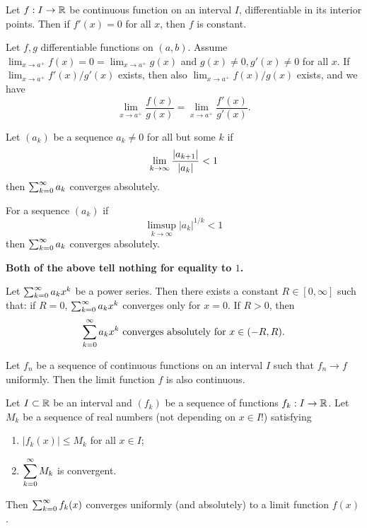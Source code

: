\documentclass[10pt, a4paper]{article}
\newcommand{\lhopital}[0]{L' H\^opital}
\begin{document}
\begin{theorem}
    Let $f : I \to \R$ be continuous function on an interval $I$,
    differentiable in its interior points.
    Then if $f'(x) = 0$ for all $x$,
    then $f$ is constant.
\end{theorem}

\begin{theorem}[\lhopital's Rule]
    Let $f, g$ differentiable functions on $(a, b)$.
    Assume $\lim_{x \to a ^ {+}}f(x) = 0 = \lim_{x \to a ^ {+}}g(x)$ and $g(x) \neq 0, g'(x) \neq 0$ for all $x$.
    If $\lim_{x \to a ^ {+}}f'(x) / g'(x)$ exists,
    then also $\lim_{x \to a ^ {+}}f(x) / g(x)$ exists,
    and we have
    \[
    \lim_{x \to a ^ {+}}\frac{f(x)}{g(x)} = \lim_{x \to a ^ {+}}\frac{f'(x)}{g'(x)}.
    \]
\end{theorem}

\begin{theorem}
    Let $(a_k)$ be a sequence $a_k \neq 0$ for all but some $k$ if
    \[
    \liminfty[k]\frac{|a_{k + 1}|}{|a_k|} < 1
    \]
    then $\infsumo a_k$ converges absolutely.
\end{theorem}

\begin{theorem}
    For a sequence $(a_k)$ if
    \[
    \limsup_{k \to \infty}|a_k| ^ {1 / k} < 1
    \]
    then $\infsumo a_k$ converges absolutely.
\end{theorem}

\textbf{Both of the above tell nothing for equality to $1$.}

\begin{theorem}
    Let $\infsumo a_kx ^ k$ be a power series.
    Then there exists a constant $R \in [0, \infty]$ such that:
    if $R = 0$,
    $\infsumo a_kx ^ k$ converges only for $x = 0$.
    If $R > 0$,
    then
    \[
    \infsumo a_kx ^ k\text{ converges absolutely for $x \in (-R, R)$}.
    \]
\end{theorem}

\begin{theorem}
    Let $f_n$ be a sequence of continuous functions on an interval $I$ such that $f_n \to f$ uniformly.
    Then the limit function $f$ is also continuous.
\end{theorem}

\begin{theorem}
    Let $I \subset \R$ be an interval and $(f_k)$ be a sequence of functions $f_k : I \to \R$.
    Let $M_k$ be a sequence of real numbers
    (not depending on $x \in I$!)
    satisfying
    \begin{center}
        \begin{enumerate}[label = (\roman*)]
            \item $|f_k(x)| \leq M_k$ for all $x \in I$;
    
            \item $\displaystyle \infsumo M_k$ is convergent.
        \end{enumerate}
    \end{center}
    Then $\infsumo f_k(x)$ converges uniformly
    (and absolutely)
    to a limit function $f(x)$.
\end{theorem}
\end{document}
